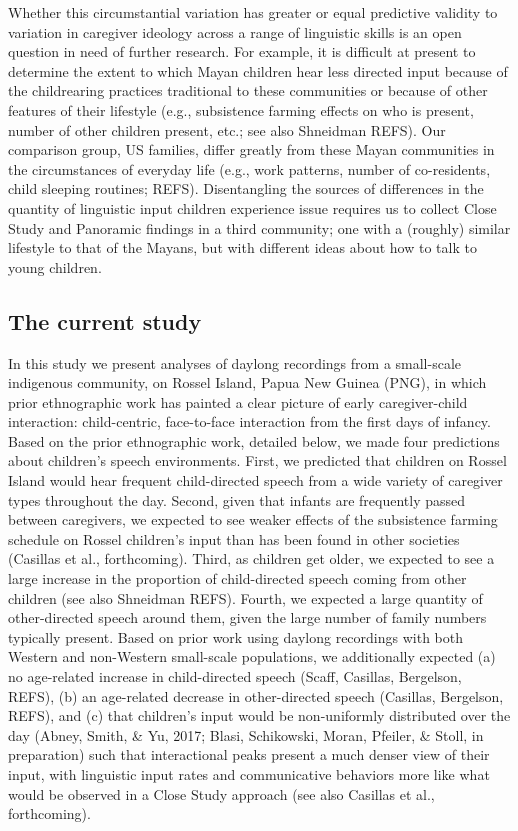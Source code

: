 \documentclass[,man,floatsintext]{apa6}
\begin{document}
Whether this circumstantial variation has greater or equal predictive
validity to variation in caregiver ideology across a range of linguistic
skills is an open question in need of further research. For example, it
is difficult at present to determine the extent to which Mayan children
hear less directed input because of the childrearing practices
traditional to these communities or because of other features of their
lifestyle (e.g., subsistence farming effects on who is present, number
of other children present, etc.; see also Shneidman REFS). Our
comparison group, US families, differ greatly from these Mayan
communities in the circumstances of everyday life (e.g., work patterns,
number of co-residents, child sleeping routines; REFS). Disentangling
the sources of differences in the quantity of linguistic input children
experience issue requires us to collect Close Study and Panoramic
findings in a third community; one with a (roughly) similar lifestyle to
that of the Mayans, but with different ideas about how to talk to young
children.

\subsection{The current study}\label{the-current-study}

In this study we present analyses of daylong recordings from a
small-scale indigenous community, on Rossel Island, Papua New Guinea
(PNG), in which prior ethnographic work has painted a clear picture of
early caregiver-child interaction: child-centric, face-to-face
interaction from the first days of infancy. Based on the prior
ethnographic work, detailed below, we made four predictions about
children's speech environments. First, we predicted that children on
Rossel Island would hear frequent child-directed speech from a wide
variety of caregiver types throughout the day. Second, given that
infants are frequently passed between caregivers, we expected to see
weaker effects of the subsistence farming schedule on Rossel children's
input than has been found in other societies (Casillas et al.,
forthcoming). Third, as children get older, we expected to see a large
increase in the proportion of child-directed speech coming from other
children (see also Shneidman REFS). Fourth, we expected a large quantity
of other-directed speech around them, given the large number of family
numbers typically present. Based on prior work using daylong recordings
with both Western and non-Western small-scale populations, we
additionally expected (a) no age-related increase in child-directed
speech (Scaff, Casillas, Bergelson, REFS), (b) an age-related decrease
in other-directed speech (Casillas, Bergelson, REFS), and (c) that
children's input would be non-uniformly distributed over the day (Abney,
Smith, \& Yu, 2017; Blasi, Schikowski, Moran, Pfeiler, \& Stoll, in
preparation) such that interactional peaks present a much denser view of
their input, with linguistic input rates and communicative behaviors
more like what would be observed in a Close Study approach (see also
Casillas et al., forthcoming).
\end{document}
